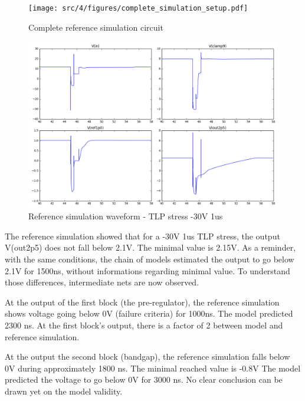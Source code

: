 \begin{figure}[!htbp]
  \centering
  \texttt{[image: src/4/figures/complete\_simulation\_setup.pdf]}
  \caption{Complete reference simulation circuit}
  \label{fig:reference_simu_circuit}
\end{figure}

\begin{figure}[!htbp]
  \centering
  \includegraphics[width=\textwidth]{src/4/figures/total_simulation.png}
  \caption{Reference simulation waveform - TLP stress -30V 1us }
  \label{fig:reference_simu}
\end{figure}

The reference simulation showed that for a -30V 1us TLP stress, the output V(out2p5) does not fall below 2.1V.
The minimal value is 2.15V.
As a reminder, with the same conditions, the chain of models estimated the output to go below 2.1V for 1500ns, without informations regarding minimal value.
To understand those differences, intermediate nets are now observed.

At the output of the first block (the pre-regulator), the reference simulation shows voltage going below 0V (failure criteria) for 1000ns.
The model predicted 2300 ns.
At the first block's output, there is a factor of 2 between model and reference simulation.

At the output the second block (bandgap), the reference simulation falls below 0V during approximately 1800 ns.
The minimal reached value is -0.8V
The model predicted the voltage to go below 0V for 3000 ns.
No clear conclusion can be drawn yet on the model validity.

